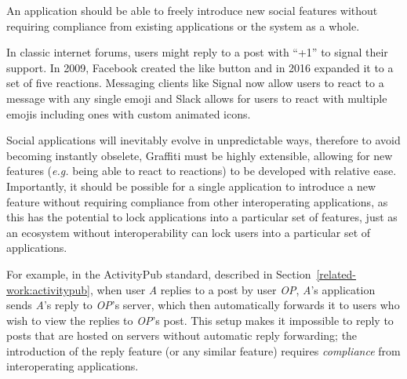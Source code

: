 


\begin{requirement}
\label{requirements:autonomous-extensibility}
    An application should be able to freely introduce new social features without requiring compliance from existing applications or the system as a whole.
\end{requirement}

In classic internet forums, users might reply to a post with ``+1'' to signal their support.
In 2009, Facebook created the like button and in 2016 expanded it to a set of five reactions.
Messaging clients like Signal now allow users to react to a message with any single emoji and
Slack allows for users to react with multiple emojis including ones with custom animated icons.

Social applications will inevitably evolve in unpredictable ways,
therefore to avoid becoming instantly obselete, Graffiti must be highly extensible,
allowing for new features (\emph{e.g.} being able to react to reactions)
to be developed with relative ease.
Importantly, it should be possible for a single application to introduce a new feature
without requiring compliance from other interoperating applications, as this has the potential to
lock applications into a particular set of features,
just as an ecosystem without interoperability can lock users into a
particular set of applications.

For example, in the ActivityPub standard, described in Section~\ref{related-work:activitypub},
when user \emph{A} replies to a post by user \emph{OP}, \emph{A}'s application
sends \emph{A}'s reply to \emph{OP}'s server, which then automatically forwards
it to users who wish to view the replies to \emph{OP}'s post.
This setup makes it impossible to reply to posts that are hosted on servers
without automatic reply forwarding;
the introduction of the reply feature (or any similar feature) requires \emph{compliance}
from interoperating applications.

